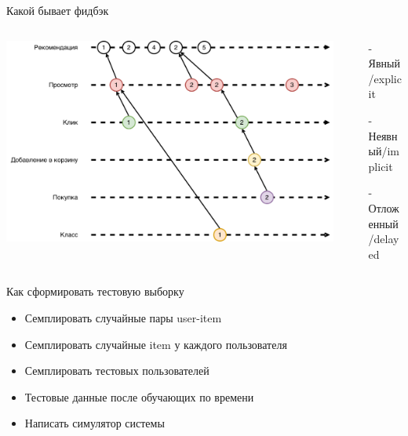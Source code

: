 \documentclass[11pt,aspectratio=169,handout]{beamer}
\begin{document}
\begin{frame}{Какой бывает фидбэк}

\begin{columns}
\begin{column}{0.55\textwidth}
   \begin{center}
     \includegraphics[scale=0.2]{images/recommendation-events.png}
  \end{center}
\end{column}
\begin{column}{0.4\textwidth}
    \begin{tcolorbox}[colback=gray!5,colframe=gray!80,title=Техническая метрика]
    \begin{itemize}%
    \item[-] Явный/explicit
    \item[-] Неявный/implicit
    \item[-] Отложенный/delayed
    \end{itemize}
    \end{tcolorbox}
\end{column}
\end{columns}

\end{frame}

\begin{frame}{Как сформировать тестовую выборку}

\begin{itemize} [<+->]
\item Семплировать случайные пары user-item
\item Семплировать случайные item у каждого пользователя 
\item Семплировать тестовых пользователей
\item Тестовые данные после обучающих по времени
\item Написать симулятор системы
\end{itemize}

\end{frame}
\end{document}
